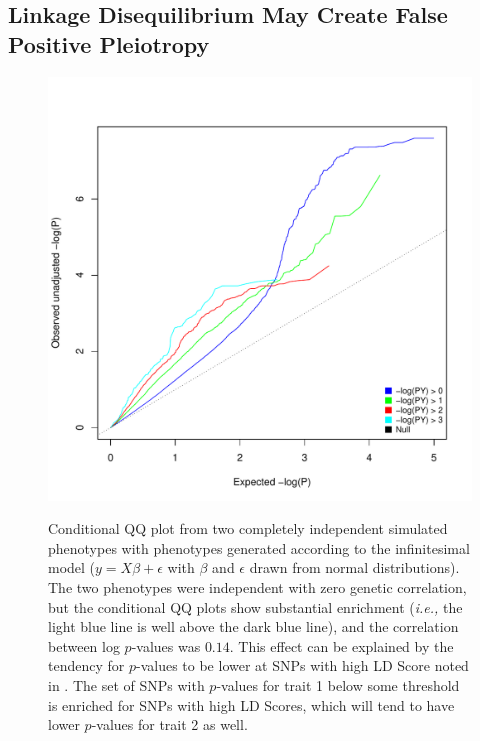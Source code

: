 \documentclass[11pt]{article}
\numberwithin{equation}{section}
\numberwithin{definition}{section}
\numberwithin{thm}{section}
\numberwithin{lemma}{section}
\numberwithin{prop}{section}
\numberwithin{cor}{section}
\numberwithin{hyp}{section}
\begin{document}
\subsection{Linkage Disequilibrium May Create False Positive Pleiotropy}
\begin{figure}[!ht]

\begin{centering}
    \includegraphics[scale=0.8]{figs/infinitesimal_sim.pdf}
         \label{pleiotropy}


Conditional QQ plot from two completely independent simulated phenotypes with phenotypes generated according to the 
infinitesimal model ($y=X\beta + \epsilon$ with $\beta$ and $\epsilon$ drawn from normal distributions). 
The two phenotypes were independent with zero genetic correlation, but the conditional QQ plots show substantial enrichment
(\emph{i.e.,} the light blue line is well above the dark blue line), 
and the correlation between log $p$-values was $0.14$. 
This effect can be explained by the tendency for $p$-values to be lower at SNPs with high LD Score noted in 
\cite{buliksullivan2014}. 
The set of SNPs with $p$-values for trait 1 below some threshold is enriched for SNPs with high LD Scores,
which will tend to have lower $p$-values for trait 2 as well. 

\end{centering}
\end{figure}
\newpage
\end{document}

